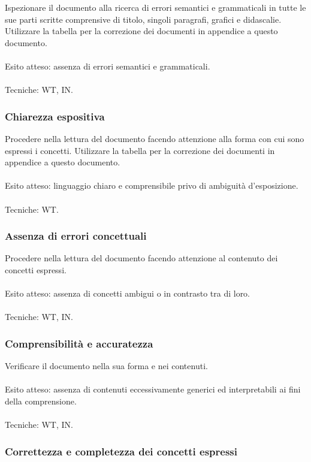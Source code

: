 Ispezionare il documento alla ricerca di errori semantici e grammaticali in
tutte le sue parti scritte comprensive di titolo, singoli paragrafi, grafici e didascalie.
Utilizzare la tabella per la correzione dei documenti in appendice a questo
documento.
\\\\
Esito atteso: assenza di errori semantici e grammaticali.
\\\\
Tecniche: WT, IN.

\subsubsection*{Chiarezza espositiva}

Procedere nella lettura del documento facendo attenzione alla forma con cui
sono espressi i concetti. Utilizzare la tabella per la correzione dei documenti
in appendice a questo documento.
\\\\
Esito atteso: linguaggio chiaro e comprensibile privo di ambiguit\`a
d'esposizione.
\\\\
Tecniche: WT.

\subsubsection*{Assenza di errori concettuali}

Procedere nella lettura del documento facendo attenzione al contenuto dei
concetti espressi.\\\\
Esito atteso: assenza di concetti ambigui o in contrasto tra di loro.
\\\\
Tecniche: WT, IN.

\subsubsection*{Comprensibilit\`a e accuratezza}

Verificare il documento nella sua forma e nei contenuti.
\\\\
Esito atteso: assenza di contenuti eccessivamente generici ed interpretabili ai
fini della comprensione.
\\\\
Tecniche: WT, IN.

\subsubsection*{Correttezza e completezza dei concetti espressi}

